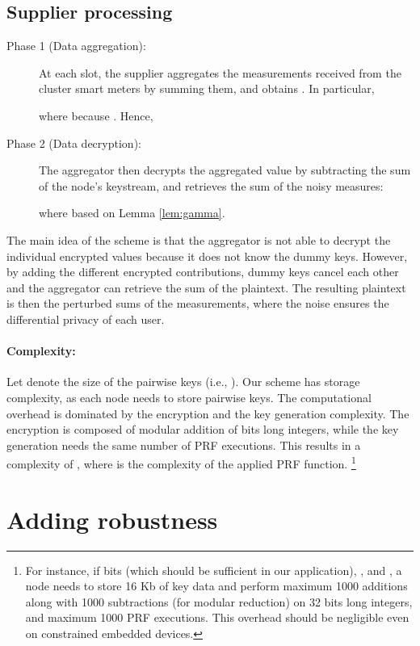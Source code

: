 \documentclass[11pt,a4paper]{article}
\theoremstyle{plain}
\theoremstyle{plain}
\theoremstyle{plain}
\theoremstyle{plain}
\theoremstyle{nonumberplain} \theoremseparator{}
\begin{document}
\subsection{Supplier processing}

\begin{description}
\item[Phase 1 (Data aggregation):] At each slot, the supplier aggregates the  measurements received from the cluster smart meters by summing them, and obtains . In particular,

where  because . Hence, 



\item[Phase 2 (Data decryption):] The aggregator then decrypts the aggregated value by subtracting the sum of the node's keystream, and retrieves the sum of the noisy measures:

where 
based on Lemma \ref{lem:gamma}.
\end{description}
The main idea of the scheme is that the aggregator is not able to decrypt the
individual encrypted values because it does not know the dummy keys.
However, by adding the different encrypted contributions, dummy keys
cancel each other and the aggregator can retrieve the sum of the plaintext. 
The resulting plaintext is then the perturbed sums of the measurements, where the
noise ensures the differential privacy of each user.

\paragraph{Complexity:} Let  denote the size of the pairwise keys (i.e., ). Our scheme has  storage complexity, as each node needs to store  pairwise keys. The computational overhead is dominated by the encryption and the key generation complexity. The encryption is composed of  modular addition of  bits long integers, while the key generation needs the same number of PRF executions. This results in a complexity of , where  is the complexity of the applied PRF function. \footnote{For instance, if  bits (which should be sufficient in our application), , and , a node needs to store 16 Kb of key data and perform  maximum 1000 additions along with 1000 subtractions (for modular reduction) on 32 bits long integers, and maximum 1000 PRF executions. This overhead should be negligible even on constrained embedded devices.}



\section{Adding robustness}
\label{sec:robust}
\end{document}
